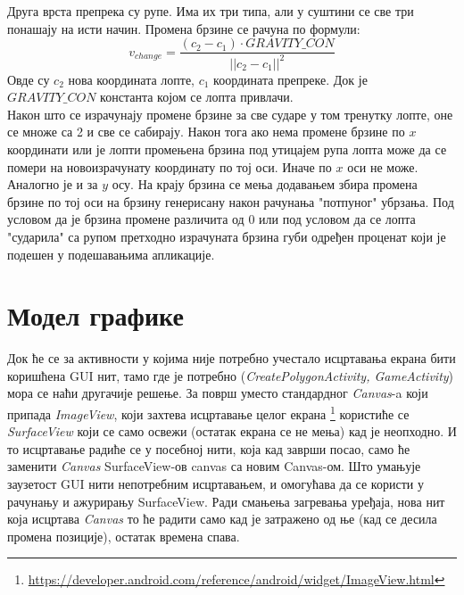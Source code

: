 Друга врста препрека су рупе.
Има их три типа, али у суштини се све три понашају на исти начин.
Промена брзине се рачуна по формули:
$$v_{change} =  \frac{(c_2 - c_1) \cdot GRAVITY\_CON}{|| c_2-c_1||^2}$$
Овде су $c_2$ нова координата лопте, $c_1$ координата препреке. Док је $GRAVITY\_CON$ константа којом се лопта привлачи.
\\ \indent
Након што се израчунају промене брзине за све сударе у том тренутку лопте, оне се множе са 2 и све се сабирају. Након тога ако нема промене брзине по $x$ координати или је лопти промењена брзина под утицајем рупа лопта може да се помери на новоизрачунату координату по тој оси. Иначе по $x$ оси не може. Аналогно је и за $y$ осу. На крају брзина се мења додавањем збира промена брзине по тој оси на брзину генерисану након рачунања "потпуног" убрзања. Под условом да је брзина промене различита од 0 или под условом да се лопта "сударила" са рупом претходно израчуната брзина губи одређен проценат који је подешен у подешавањима апликације.

\section{Модел графике}
Док ће се за активности у којима није потребно учестало исцртавања екрана бити коришћена GUI нит, тамо где је потребно (\emph{CreatePolygonActivity, GameActivity}) мора се наћи другачије решење. За површ уместо стандардног \emph{Canvas}-a који припада \emph{ImageView}, који захтева исцртавање целог екрана \footnote{\url{https://developer.android.com/reference/android/widget/ImageView.html}} користиће се \emph{SurfaceView} који се само освежи (остатак екрана се не мења) кад је неопходно. И то исцртавање радиће се у посебној нити, која кад заврши посао, само ће заменити \emph{Canvas}  SurfaceView-ов canvas са новим Canvas-ом. Што умањује заузетост GUI нити непотребним исцртавањем, и омогућава да се користи у рачунању и ажурирању SurfaceView.
Ради смањења загревања уређаја, нова нит која исцртава \emph{Canvas} то ће радити само кад је затражено од ње (кад се десила промена позиције), остатак времена спава. 
